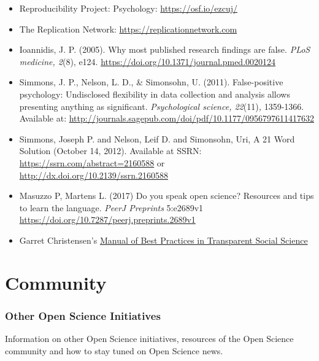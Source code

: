 \documentclass[12pt,]{report}
\providecommand{\tightlist}{%
  \setlength{\itemsep}{0pt}\setlength{\parskip}{0pt}}
\begin{document}
\begin{itemize}
\tightlist
\item
  Reproducibility Project: Psychology: \url{https://osf.io/ezcuj/}
\item
  The Replication Network: \url{https://replicationnetwork.com}
\item
  Ioannidis, J. P. (2005). Why most published research findings are
  false. \emph{PLoS medicine, 2}(8), e124.
  \url{https://doi.org/10.1371/journal.pmed.0020124}
\item
  Simmons, J. P., Nelson, L. D., \& Simonsohn, U. (2011). False-positive
  psychology: Undisclosed flexibility in data collection and analysis
  allows presenting anything as significant. \emph{Psychological
  science, 22}(11)\emph{,} 1359-1366. Available at:
  \url{http://journals.sagepub.com/doi/pdf/10.1177/0956797611417632}
\item
  Simmons, Joseph P. and Nelson, Leif D. and Simonsohn, Uri, A 21 Word
  Solution (October 14, 2012). Available at SSRN:
  \url{https://ssrn.com/abstract=2160588} or
  \url{http://dx.doi.org/10.2139/ssrn.2160588}
\item
  Masuzzo P, Martens L. (2017) Do you speak open science? Resources and
  tips to learn the language. \emph{PeerJ Preprints} 5:e2689v1
  \url{https://doi.org/10.7287/peerj.preprints.2689v1}
\item
  Garret Christensen's
  \href{https://github.com/garretchristensen/BestPracticesManual/blob/master/Manual.pdf}{Manual
  of Best Practices in Transparent Social Science}
\end{itemize}

\hypertarget{community}{\chapter{Community}\label{community}}

\subsection{Other Open Science
Initiatives}\label{other-open-science-initiatives}

Information on other Open Science initiatives, resources of the Open
Science community and how to stay tuned on Open Science news.
\end{document}

